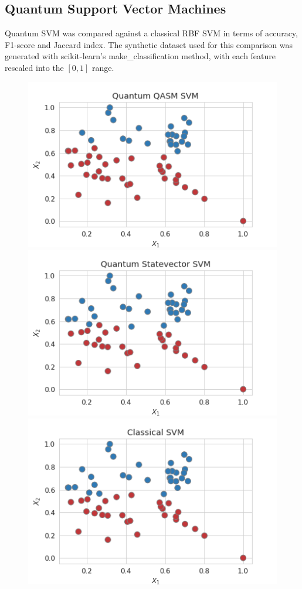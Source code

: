 \documentclass{article}
\begin{document}
\begin{multicols}{2}
\subsection{Quantum Support Vector Machines}
Quantum SVM was compared against a classical RBF SVM in terms of accuracy, F1-score and Jaccard index. The synthetic dataset used for this comparison was generated with scikit-learn's make\_classification method, with each feature rescaled into the $[0,1]$ range. 
\begin{figure}[H]
  \centering
    \includegraphics[width=\linewidth]{assets/svm/Quantum QASM SVM.png}
    \includegraphics[width=\linewidth]{assets/svm/Quantum Statevector SVM.png}
    \includegraphics[width=\linewidth]{assets/svm/Classical SVM.png}

\end{figure}
\end{multicols}
\end{document}
